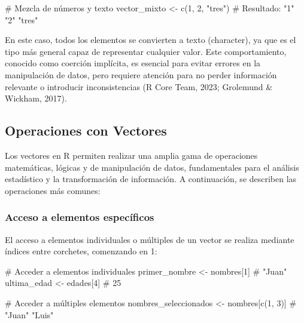 \documentclass[
  spanish,
  a4paper,
  DIV=11,
  numbers=noendperiod,
  onepage,
  openany]{scrreprt}
\newenvironment{Shaded}{\begin{snugshade}}{\end{snugshade}}
\newcommand{\CommentTok}[1]{\textcolor[rgb]{0.37,0.37,0.37}{#1}}
\newcommand{\DecValTok}[1]{\textcolor[rgb]{0.68,0.00,0.00}{#1}}
\newcommand{\FunctionTok}[1]{\textcolor[rgb]{0.28,0.35,0.67}{#1}}
\newcommand{\NormalTok}[1]{\textcolor[rgb]{0.00,0.23,0.31}{#1}}
\newcommand{\OtherTok}[1]{\textcolor[rgb]{0.00,0.23,0.31}{#1}}
\newcommand{\StringTok}[1]{\textcolor[rgb]{0.13,0.47,0.30}{#1}}
\begin{document}
\begin{Shaded}
\begin{Highlighting}[]
\CommentTok{\# Mezcla de números y texto}
\NormalTok{vector\_mixto }\OtherTok{\textless{}{-}} \FunctionTok{c}\NormalTok{(}\DecValTok{1}\NormalTok{, }\DecValTok{2}\NormalTok{, }\StringTok{"tres"}\NormalTok{)}
\CommentTok{\# Resultado: "1" "2" "tres"}
\end{Highlighting}
\end{Shaded}

En este caso, todos los elementos se convierten a texto (character), ya
que es el tipo más general capaz de representar cualquier valor. Este
comportamiento, conocido como coerción implícita, es esencial para
evitar errores en la manipulación de datos, pero requiere atención para
no perder información relevante o introducir inconsistencias (R Core
Team, 2023; Grolemund \& Wickham, 2017).

\subsection{Operaciones con Vectores}\label{operaciones-con-vectores}

Los vectores en R permiten realizar una amplia gama de operaciones
matemáticas, lógicas y de manipulación de datos, fundamentales para el
análisis estadístico y la transformación de información. A continuación,
se describen las operaciones más comunes:

\subsubsection{\texorpdfstring{\textbf{Acceso a elementos
específicos}}{Acceso a elementos específicos}}\label{acceso-a-elementos-especuxedficos}

El acceso a elementos individuales o múltiples de un vector se realiza
mediante índices entre corchetes, comenzando en 1:

\begin{Shaded}
\begin{Highlighting}[]
\CommentTok{\# Acceder a elementos individuales}
\NormalTok{primer\_nombre }\OtherTok{\textless{}{-}}\NormalTok{ nombres[}\DecValTok{1}\NormalTok{]    }\CommentTok{\# "Juan"}
\NormalTok{ultima\_edad }\OtherTok{\textless{}{-}}\NormalTok{ edades[}\DecValTok{4}\NormalTok{]       }\CommentTok{\# 25}

\CommentTok{\# Acceder a múltiples elementos}
\NormalTok{nombres\_seleccionados }\OtherTok{\textless{}{-}}\NormalTok{ nombres[}\FunctionTok{c}\NormalTok{(}\DecValTok{1}\NormalTok{, }\DecValTok{3}\NormalTok{)]  }\CommentTok{\# "Juan" "Luis"}
\end{Highlighting}
\end{Shaded}
\end{document}
